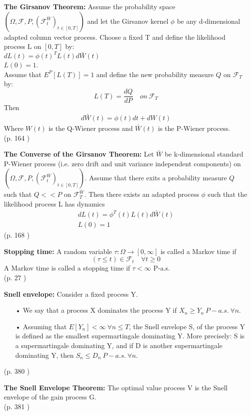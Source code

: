 \begin{theorem}\label{Girsanov}
\textbf{The Girsanov Theorem: } 
Assume the probability space $(\Omega, \mathcal{F}, P, (\mathcal{F}_t^{\bar{W}})_{t \in [0,T]})$ and let the Girsanov kernel $\phi$ be any d-dimensional adapted column vector process. Choose a fixed T and define the likelihood process L on $[0,T]$ by:\\
$dL(t)=\phi(t)^T L(t) d\bar{W}(t)$\\
$L(0)=1$.\\
Assume that $E^P[L(T)]=1$ and define the new probability measure $Q$ on $\mathcal{F}_T$ by:\\
$$L(T)=\frac{dQ}{dP} \quad on \ \mathcal{F}_T$$
Then
\begin{align}
d\bar{W}(t)=\phi(t)dt + dW(t)
\end{align}
Where $W(t)$ is the Q-Wiener process and $\bar{W}(t)$ is the P-Wiener process.\\
\null \hfill (p. 164 \parencite{finKont})
\end{theorem}

\begin{theorem}\label{ConverseGirsanov}
\textbf{The Converse of the Girsanov Theorem: } Let $\bar{W}$ be k-dimensional standard P-Wiener process (i.e. zero drift and unit variance independent components) on $(\Omega,\mathcal{F}, P, (\mathcal{F}_t^{\bar{W}})_{t \in [0,T]})$. Assume that there exits a probability measure $Q$ such that $Q<<P$ on $\mathcal{F}_T^{\bar{W}}$. Then there exists an adapted process $\phi$ such that the likelihood process L has dynamics
\begin{align*}
dL(t)=\phi^T(t) L(t)d\bar{W}(t)\\
L(0)=1
\end{align*}
\null \hfill (p. 168 \parencite{finKont})
\end{theorem}

\theoremstyle{definition}
\begin{definition}{\textbf{Stopping time: }}\label{StoppingTime}
A random variable $\tau:\Omega \to [0,\infty]$ is called a Markov time if 
$$(\tau \leq t)\in \mathcal{F}_{t} \quad \forall t \geq 0 $$
A Markov time is called a stopping time if $\tau<\infty$ P-a.s.\\
\null \hfill (p. 27 \parencite{Shiryaev06})
\end{definition}


\theoremstyle{definition}
\begin{definition}{\textbf{Snell envelope: }}\label{snellEnvelope}
Consider a fixed process Y.
\begin{enumerate}
\item[•] We say that a process X dominates the process Y if $X_n \geq Y_n \ P-a.s. \ \forall n$.
\item[•] Assuming that $E[Y_n] < \infty  \ \forall n \leq T$, the Snell envelope S, of the process Y is defined as the smallest supermartingale dominating Y. More precisely: S is a supermartingale dominating Y, and if D is another supermartingale dominating Y, then $S_n\leq D_n \ P-a.s. \ \forall n$.
\end{enumerate}
\null \hfill (p. 380 \parencite{Bjork19})
\end{definition}

\begin{theorem}\label{SnellEnvelopeTheorem}
\textbf{The Snell Envelope Theorem: } The optimal value process V is the Snell envelope of the gain process G.\\
\null \hfill (p. 381  \parencite{Bjork19})
\end{theorem}
